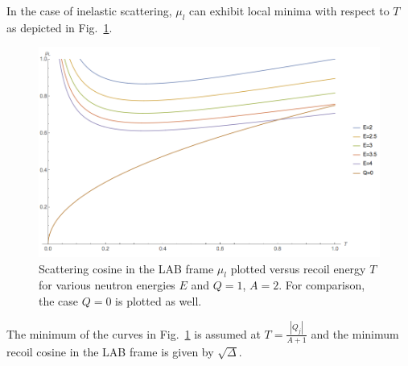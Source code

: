 \documentclass[review]{elsarticle}
\begin{document}
In the case of inelastic scattering, $\mu_l$ can exhibit local minima with respect to $T$ as depicted in Fig.~\ref{fig:mu_L_boundaries}.
\begin{figure}
	\centering
	\includegraphics[width=1.0\linewidth]{lab_scattering_cosine_vs_T.png}
	\caption{Scattering cosine in the LAB frame $\mu_l$ plotted versus recoil energy $T$ for various neutron energies $E$ and $Q=1$, $A=2$. For comparison, the case $Q=0$ is plotted as well.}
	\label{fig:mu_L_boundaries}
\end{figure}
The minimum of the curves in Fig.~\ref{fig:mu_L_boundaries} is assumed at $T=\frac{|Q_j|}{A+1}$ and the minimum recoil cosine in the LAB frame is given by $\sqrt{\Delta}$.
\end{document}

